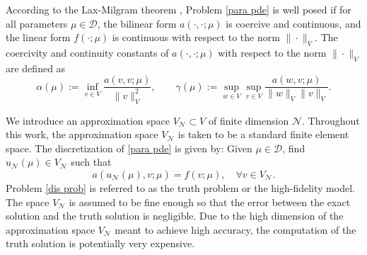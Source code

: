 \documentclass[12pt]{article}
\theoremstyle{remark}
\theoremstyle{definition}
\numberwithin{equation}{section}
\begin{document}
According to the Lax-Milgram theorem \cite{quarteroni2008numerical}, Problem \eqref{para pde} is well posed if for all parameters $\mu \in \mathcal{D}$, the bilinear form $a(\cdot, \cdot ; \mu)$ is coercive and continuous, and the linear form $f(\cdot ; \mu)$ is continuous with respect to the norm $\|\cdot\|_V$. The coercivity and continuity constants of $a(\cdot, \cdot ; \mu)$ with respect to the norm $\|\cdot\|_V$ are defined as 
\begin{equation}
    \alpha(\mu):=\inf _{v \in V} \frac{a(v, v ; \mu)}{\|v\|_{V}^2}, \quad  \quad \gamma(\mu):=\sup _{w \in V} \sup _{v \in V} \frac{a(w, v ; \mu)}{\|w\|_V \|v\|_{V}}.
    \label{corec}
\end{equation}

We introduce an approximation space $V_{\mathcal{N}} \subset V$ of finite dimension $\mathcal{N}$. Throughout this work, the approximation space $V_{\mathcal{N}}$ is taken to be a standard finite element space. The discretization of \eqref{para pde} is given by: Given $\mu \in \mathcal{D}$, find $u_{\mathcal{N}}(\mu) \in V_{\mathcal{N}}$ such that
\begin{equation}
    a(u_{\mathcal{N}}(\mu), v ; \mu)=f(v ; \mu), \quad \forall v \in V_{\mathcal{N}}.
    \label{dis prob}
\end{equation}
Problem \eqref{dis prob} is referred to as the truth problem or the high-fidelity model. The space $V_{\mathcal{N}}$ is assumed to be fine enough so that the error between the exact solution and the truth solution is negligible. Due to the high dimension of the approximation space $V_{\mathcal{N}}$ meant to achieve high accuracy, the computation of the truth solution is potentially very expensive.

\end{document}
